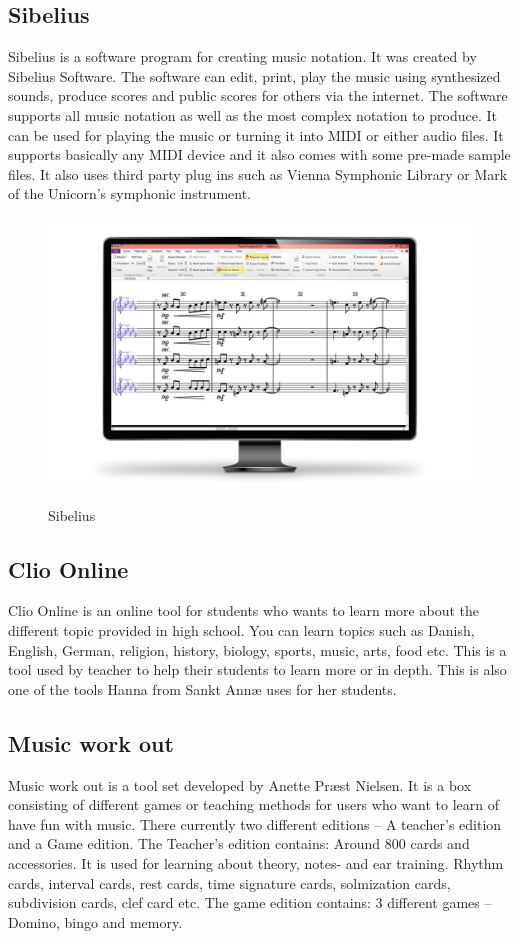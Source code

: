 \subsection{Sibelius}
Sibelius is a software program for creating music notation. It was created by Sibelius Software. The software can edit, print, play the music using synthesized sounds, produce scores and public scores for others via the internet. The software supports all music notation as well as the most complex notation to produce. It can be used for playing the music or turning it into MIDI or either audio files. It supports basically any MIDI device and it also comes with some pre-made sample files. It also uses third party plug ins such as Vienna Symphonic Library or Mark of the Unicorn’s symphonic instrument. 

\begin{figure}[H]
	\centering
	\includegraphics[width=0.7\linewidth]{figure/Analysis/Sibelius}
	\label{fig:sibelius}
	\caption{Sibelius}
\end{figure}

\subsection{Clio Online}
Clio Online is an online tool for students who wants to learn more about the different topic provided in high school. You can learn topics such as Danish, English, German, religion, history, biology, sports, music, arts, food etc. This is a tool used by teacher to help their students to learn more or in depth. This is also one of the tools Hanna from Sankt Annæ uses for her students. 

\subsection{Music work out}
Music work out is a tool set developed by Anette Præst Nielsen. It is a box consisting of different games or teaching methods for users who want to learn of have fun with music. There currently two different editions – A teacher’s edition and a Game edition.  The Teacher’s edition contains: Around 800 cards and accessories. It is used for learning about theory, notes- and ear training. Rhythm cards, interval cards, rest cards, time signature cards, solmization cards, subdivision cards, clef card etc. The game edition contains: 3 different games – Domino, bingo and memory. 


